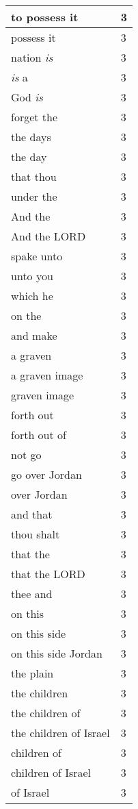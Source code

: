 \begin{center}
\begin{longtable}{|p{3.0in}|p{0.5in}|}
to possess it & 3\\ \hline 
possess it & 3\\ \hline 
nation \emph{is} & 3\\ \hline 
\emph{is} a & 3\\ \hline 
God \emph{is} & 3\\ \hline 
forget the & 3\\ \hline 
the days & 3\\ \hline 
the day & 3\\ \hline 
that thou & 3\\ \hline 
under the & 3\\ \hline 
And the & 3\\ \hline 
And the LORD & 3\\ \hline 
spake unto & 3\\ \hline 
unto you & 3\\ \hline 
which he & 3\\ \hline 
on the & 3\\ \hline 
and make & 3\\ \hline 
a graven & 3\\ \hline 
a graven image & 3\\ \hline 
graven image & 3\\ \hline 
forth out & 3\\ \hline 
forth out of & 3\\ \hline 
not go & 3\\ \hline 
go over Jordan & 3\\ \hline 
over Jordan & 3\\ \hline 
and that & 3\\ \hline 
thou shalt & 3\\ \hline 
that the & 3\\ \hline 
that the LORD & 3\\ \hline 
thee and & 3\\ \hline 
on this & 3\\ \hline 
on this side & 3\\ \hline 
on this side Jordan & 3\\ \hline 
the plain & 3\\ \hline 
the children & 3\\ \hline 
the children of & 3\\ \hline 
the children of Israel & 3\\ \hline 
children of & 3\\ \hline 
children of Israel & 3\\ \hline 
of Israel & 3\\ \hline 
\end{longtable}
\end{center}





